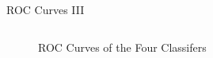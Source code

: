 \begin{frame}{ROC Curves III}
\begin{columns}[onlytextwidth]
\begin{column}{0.45\textwidth}
\begin{figure}
		\caption{ROC Curves of the Four Classifers}
		\label{fig:ROCGaussian}
	\end{figure}
\end{column}
\end{columns}
\end{frame}
